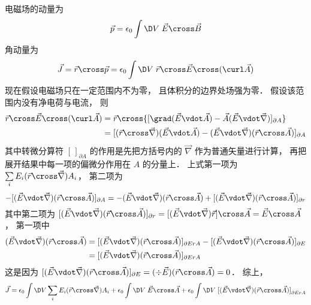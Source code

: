 
电磁场的动量为
\begin{equation}
\vec p = {\epsilon _0}\int {\D V\;\vec E \cross \vec B}
\end{equation}
角动量为
\begin{equation}
\vec J = \vec r \cross \vec p = {\epsilon _0}\int {\D V\;\vec r \cross \vec E \cross (\curl \vec A)} 
\end{equation}
现在假设电磁场只在一定范围内不为零， 且体积分的边界处场强为零． 假设该范围内没有净电荷与电流， 则
\begin{equation}
\begin{aligned}
  \vec r \cross \vec E \cross (\curl \vec A) &= \vec r \cross {[\grad (\vec E \vdot \vec A) - \vec A(\vec E \vdot \vec\nabla )]_{\partial A}} \\
  &= {[(\vec r \cross \vec\nabla )(\vec E \vdot \vec A) - (\vec E \vdot \vec\nabla )(\vec r \cross \vec A)]_{\partial A}}
\end{aligned}
\end{equation}
其中转微分算符 ${[\,]_{\partial A}}$ 的作用是先把方括号内的 $\vec\nabla$ 作为普通矢量进行计算， 再把展开结果中每一项的偏微分作用在 $A$ 的分量上． 上式第一项为 $\sum\limits_i {{E_i}} (\vec r \cross \vec\nabla ){A_i}$， 第二项为
\begin{equation}
   - {[(\vec E \vdot \vec\nabla )(\vec r \cross \vec A)]_{\partial A}} =  - (\vec E \vdot \vec\nabla )(\vec r \cross \vec A) + {[(\vec E \vdot \vec\nabla )(\vec r \cross \vec A)]_{\partial r}}
\end{equation}
其中第二项为 ${[(\vec E \vdot \vec\nabla )(\vec r \cross \vec A)]_{\partial r}} = [(\vec E \vdot \vec\nabla )\vec r] \cross \vec A = \vec E \cross \vec A$， 第一项中
\begin{equation}
\begin{aligned}
  (\vec E \vdot \vec\nabla )(\vec r \cross \vec A) &= {[(\vec E \vdot \vec\nabla )(\vec r \cross \vec A)]_{\partial ErA}} - {[(\vec E \vdot \vec\nabla )(\vec r \cross \vec A)]_{\partial E}}\\
  & = {[(\vec E \vdot \vec\nabla )(\vec r \cross \vec A)]_{\partial ErA}}
  \end{aligned}
\end{equation}
这是因为 ${[(\vec E \vdot \vec\nabla )(\vec r \cross \vec A)]_{\partial E}} = (\div\vec E)(\vec r \cross \vec A) = 0$．  综上，
\begin{equation}
\vec J = {\epsilon _0}\int {\D V\sum\limits_i {{E_i}} (\vec r \cross \vec\nabla ){A_i} + {\epsilon _0}\int {\D V\;\vec E \cross \vec A} }  + {\epsilon _0}\int {\D V\;{{[(\vec E \vdot \vec\nabla )(\vec r \cross \vec A)]}_{\partial ErA}}}
\end{equation}
